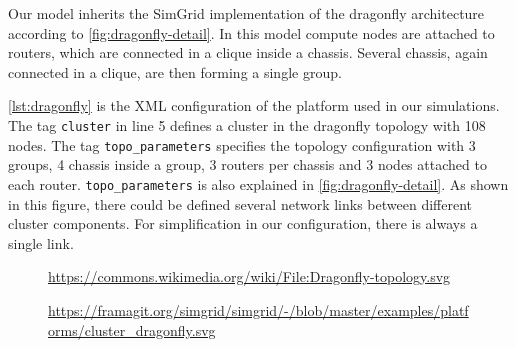 \documentclass[thesis-en.tex]{subfiles}
\begin{document}
Our model inherits the SimGrid implementation of the dragonfly architecture according to \autoref{fig:dragonfly-detail}. In this model compute nodes are attached to routers, which are connected in a clique inside a chassis. Several chassis, again connected in a clique, are then forming a single group.

\autoref{lst:dragonfly} is the XML configuration of the platform used in our simulations. The tag \verb|cluster| in line 5 defines a cluster in the dragonfly topology with 108 nodes. The tag \verb|topo_parameters| specifies the topology configuration with 3 groups, 4 chassis inside a group, 3 routers per chassis and 3 nodes attached to each router. \verb|topo_parameters| is also explained in \autoref{fig:dragonfly-detail}. As shown in this figure, there could be defined several network links between different cluster components. For simplification in our configuration, there is always a single link.


\begin{figure}[p]
    \centering
    
    {\url{https://commons.wikimedia.org/wiki/File:Dragonfly-topology.svg}}
    \label{fig:dragonfly-topology}
\end{figure}

\begin{figure}[p]
    \centering
    
    {\url{https://framagit.org/simgrid/simgrid/-/blob/master/examples/platforms/cluster_dragonfly.svg}}
    \label{fig:dragonfly-detail}
\end{figure}

%     
    
\end{document}

